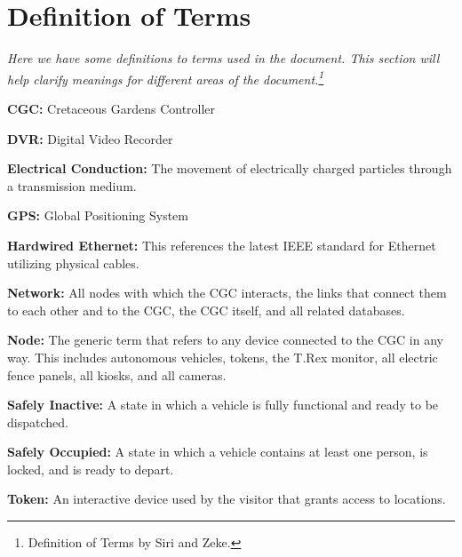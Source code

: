 \documentclass[12pt]{article}
\begin{document}
\section{Definition of Terms}
\label{def}
\textit{Here we have some definitions to terms used in the document. This section will help clarify meanings for different 
areas of the document.\footnote {Definition of Terms by Siri and Zeke.}}
\begin{list}{}{}
	\item \textbf{CGC:} Cretaceous Gardens Controller 
	\item \textbf{DVR:} Digital Video Recorder
	\item \textbf{Electrical Conduction:} The movement of electrically charged particles through a transmission medium.
	\item \textbf{GPS:} Global Positioning System 
	\item \textbf{Hardwired Ethernet:} This references the latest IEEE standard for Ethernet utilizing physical cables.
	\item \textbf{Network:} All nodes with which the CGC interacts, the links that connect them to each other and to the
	CGC, the CGC itself, and all related databases.
	\item \textbf{Node:} The generic term that refers to any device connected to the CGC in any way. This includes 
	autonomous vehicles, tokens, the T.Rex monitor, all electric fence panels, all kiosks, and all cameras.
	\item \textbf{Safely Inactive:} A state in which a vehicle is fully functional and ready to be dispatched.
	\item \textbf{Safely Occupied:} A state in which a vehicle contains at least one person, is locked, and is ready to depart.
	\item \textbf{Token:} An interactive device used by the visitor that grants access to locations.
\end{list}


\end{document}

